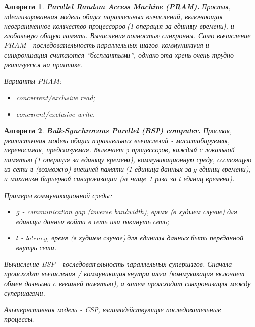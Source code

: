 \documentclass[a4paper]{article}
\theoremstyle{indented}
\newtheorem{alg}{Алгоритм}
\theoremstyle{definition}
\theoremstyle{remark}
\begin{document}
\begin{alg}
    \textbf{Parallel Random Access Machine (PRAM).} Простая, идеализированная модель общих параллельных вычислений, включающая неограниченное количество \textit{процессоров} (1 операция за единицу времени), и глобальную общую память. Вычисления полностью синхронны. Само вычисление $PRAM$ - последовательность параллельных \textit{шагов}, коммуникауия и синхронизация считаются ''бесплантыми'', однако эта хрень очень трудно реализуется на практике. \ 

    Варианты PRAM: 

    \begin{itemize}
        \item concurrent/exclusive read;
        \item concurent/exclusive write.
    \end{itemize}
\end{alg}

\begin{alg}
    \textbf{Bulk-Synchronous Parallel (BSP) computer.} Простая, реалистичная модель общих параллельных вычислений - масштабируемая, переносимая, предсказуемая. Включает $p$ процессоров, каждый с \textit{локальной памятью} (1 операция за единицу времени), \textit{коммуникационную среду}, состоящую из сети и (возможно) \textit{внешней памяти} (1 единица данных за $g$ единиц времени), и маханизм \textit{барьерной синхронизации} (не чаще 1 раза за $l$ единиц времени). \ 

    Примеры коммуникационной среды:

    \begin{itemize}
        \item $g$ - \textit{communication gap} (inverse bandwidth), время (в худшем случае) для единицы данных войти в сеть или покинуть сеть; 
        \item $l$ - \textit{latency}, время (в худшем случае) для единицы данных быть переданной внутрь сети.
    \end{itemize}

    Вычисление BSP - последовательность параллельных \textit{супершагов}. Сначала происходят вычисления / коммуникация внутри шага (коммуникация включает обмен данными с внешней памятью), а затем происходит синхронизация между супершагами. \ 

    Альтернативная модель - CSP, взаимодействующие последовательные процессы.
\end{alg}
\end{document}
